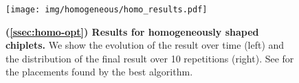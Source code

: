 \begin{figure}[h]
\centering
\captionsetup{justification=centering}
%
\vspace{-1em}
\texttt{[image: img/homogeneous/homo\_results.pdf]}
%
\caption{\textbf{(\textsection \ref{ssec:homo-opt}) Results for homogeneously shaped chiplets.}
We show the evolution of the result over time (left) and the distribution of the final result over 10 repetitions (right).
See  for the placements found by the best algorithm.}
\vspace{-0.75em}
\label{fig:homo-results}
\end{figure}

